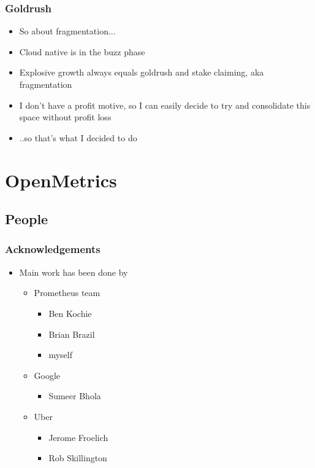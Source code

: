 \documentclass[aspectratio=169]{beamer}
\begin{document}
\begin{frame}
	\frametitle{Goldrush}
	\vfill
	\begin{itemize}
		\item So about fragmentation...
		\item Cloud native is in the buzz phase
		\item Explosive growth always equals goldrush and stake claiming, aka fragmentation
		\item I don't have a profit motive, so I can easily decide to try and consolidate this space without profit loss
		\item ..so that's what I decided to do
	\end{itemize}
	\vfill
\end{frame}


\section{OpenMetrics}

\subsection{People}

\begin{frame}
	\frametitle{Acknowledgements}
	\vfill
	\begin{itemize}
		\item Main work has been done by
		\begin{itemize}
			\item Prometheus team
			\begin{itemize}
				\item Ben Kochie
				\item Brian Brazil
				\item myself
			\end{itemize}
			\item Google
			\begin{itemize}
				\item Sumeer Bhola
			\end{itemize}
			\item Uber
			\begin{itemize}
				\item Jerome Froelich
				\item Rob Skillington
			\end{itemize}
		\end{itemize}
	\end{itemize}
	\vfill
\end{frame}
\end{document}
